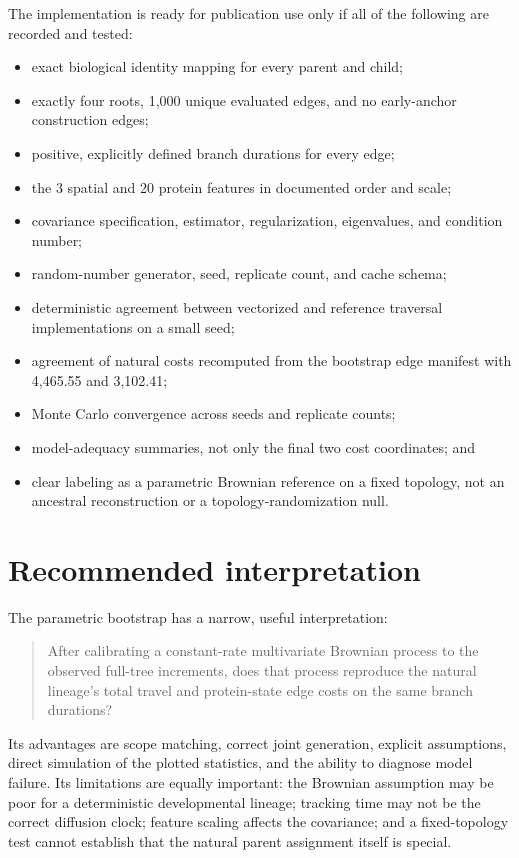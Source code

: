 \documentclass[10pt]{article}
\begin{document}
The implementation is ready for publication use only if all of the following
are recorded and tested:

\begin{itemize}
  \item exact biological identity mapping for every parent and child;
  \item exactly four roots, 1,000 unique evaluated edges, and no early-anchor
        construction edges;
  \item positive, explicitly defined branch durations for every edge;
  \item the 3 spatial and 20 protein features in documented order and scale;
  \item covariance specification, estimator, regularization, eigenvalues, and
        condition number;
  \item random-number generator, seed, replicate count, and cache schema;
  \item deterministic agreement between vectorized and reference traversal
        implementations on a small seed;
  \item agreement of natural costs recomputed from the bootstrap edge manifest
        with 4,465.55 and 3,102.41;
  \item Monte Carlo convergence across seeds and replicate counts;
  \item model-adequacy summaries, not only the final two cost coordinates; and
  \item clear labeling as a parametric Brownian reference on a fixed topology,
        not an ancestral reconstruction or a topology-randomization null.
\end{itemize}

\section{Recommended interpretation}

The parametric bootstrap has a narrow, useful interpretation:

\begin{quote}
After calibrating a constant-rate multivariate Brownian process to the observed
full-tree increments, does that process reproduce the natural lineage's total
travel and protein-state edge costs on the same branch durations?
\end{quote}

Its advantages are scope matching, correct joint generation, explicit
assumptions, direct simulation of the plotted statistics, and the ability to
diagnose model failure.  Its limitations are equally important: the Brownian
assumption may be poor for a deterministic developmental lineage; tracking
time may not be the correct diffusion clock; feature scaling affects the
covariance; and a fixed-topology test cannot establish that the natural parent
assignment itself is special.
\end{document}
